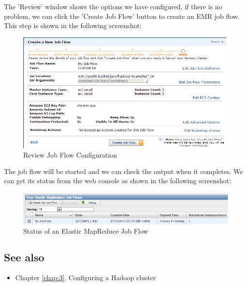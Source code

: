The 'Review' window shows the options we have configured, if there is no problem, we can click the 'Create Job Flow' button to create an EMR job flow. This step is shown in the following screenshot:
\begin{figure}[ht]
  \centering
  \includegraphics[width=\textwidth]{figs/5163os_08_27.png}
  \caption{Review Job Flow Configuration}\label{fig:aws.elasticmapred.flow.review}
\end{figure} 
The job flow will be started and we can check the output when it completes. We can get its status from the web console as shown in the following screenshot:
\begin{figure}[ht]
  \centering
  \includegraphics[width=\textwidth]{figs/5163os_08_28.png}
  \caption{Status of an Elastic MapReduce Job Flow}\label{fig:aws.elasticmapred.flow.status}
\end{figure} 
\subsection*{See also}
\begin{itemize}
  \item Chapter \ref{chap:3}, Configuring a Hadoop cluster
\end{itemize}

